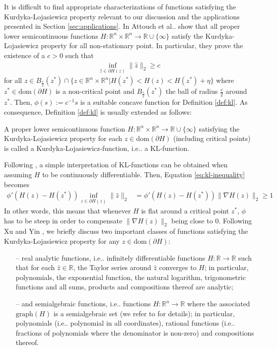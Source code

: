 \documentclass[onecolumn,final,a4paper,13pt,reqno]{siamart}
\makeatletter
\DeclareRobustCommand\onedot{\futurelet\@let@token\@onedot}
\def\@onedot{\ifx\@let@token.\else.\null\fi\xspace}
\def\ie{{i.e}\onedot} \def\Ie{{I.e}\onedot}
\def\etal{{et al}\onedot}
\def\dom{\text{dom}}
\makeatother
\begin{document}
It is difficult to find appropriate characterizations of functions satisfying the Kurdyka-Lojasiewicz property relevant to our discussion and the applications presented in Section \ref{sec:applications}. In \cite{AttouchBolteRedontSoubeyran:2010} Attouch \etal show that all proper lower semicontinuous functions $H : \mathbb{R}^n \times \mathbb{R}^n \rightarrow \mathbb{R} \cup \{\infty\}$ satisfy the Kurdyka-Lojasiewicz property for all non-stationary point. In particular, they prove the existence of a $c > 0$ such that
\begin{align}
	\inf_{\hat{z} \in \partial H(z)} \|\hat{z}\|_2 \geq c
\end{align}
for all $z \in B_{\frac{c}{2}}(z^\ast) \cap \{z \in \mathbb{R}^n \times \mathbb{R}^n | H(z^\ast) < H(z) < H(z^\ast) + \eta\}$ where $z^\ast \in \dom(\partial H)$ is a non-critical point and $B_{\frac{c}{2}}(z^\ast)$ the ball of radius $\frac{c}{2}$ around $z^\ast$. Then, $\phi(s) := c^{-1}s$ is a suitable concave function for Definition \ref{def:kl}. As consequence, Definition \ref{def:kl} is usually extended as follows:

\begin{definitionmd}
	A proper lower semicontinuous function $H : \mathbb{R}^n \times \mathbb{R}^n \rightarrow \mathbb{R} \cup \{\infty\}$ satisfying the Kurdyka-Lojasiewicz property for each $z \in \dom (\partial H)$ (including critical points) is called a Kurdyka-Lojasiewicz-function, \ie a KL-function.
\end{definitionmd}

Following \cite{FrankelGarrigosPeypuquet:2015}, a simple interpretation of KL-functions can be obtained when assuming $H$ to be continuously differentiable. Then, Equation \eqref{eq:kl-inequality} becomes
\begin{align}
	\phi'(H(z) - H(z^\ast)) \inf_{\hat{z} \in \partial H(z)}\|\hat{z}\|_2 &= \phi'(H(z) - H(z^\ast)) \|\nabla H(z)\|_2 \geq 1
\end{align}
In other words, this means that whenever $H$ is flat around a critical point $z^\ast$, $\phi$ has to be steep in order to compensate $\|\nabla H(z)\|_2$ being close to $0$. Following Xu and Yin \cite{XuYin:2013}, we briefly discuss two important classes of functions satisfying the Kurdyka-Lojasiewicz property for any $z \in \dom (\partial H)$:
\begin{itemize}
	\item[--] real analytic functions, \ie infinitely differentiable functions $H: \mathbb{R} \rightarrow \mathbb{R}$ such that for each $\hat{z} \in \mathbb{R}$, the Taylor series around $\hat{z}$ converges to $H$; in particular, polynomials, the exponential function, the natural logarithm, trigonometric functions and all sums, products and compositions thereof are analytic;
	\item[--] and semialgebraic functions, \ie functions $H : \mathbb{R}^n \rightarrow \mathbb{R}$ where the associated  $\text{graph}(H)$ is a semialgebraic set (we refer to \cite{Coste:2002} for details); in particular, polynomials (\ie polynomial in all coordinates),  rational functions (\ie fractions of polynomials where the denominator is non-zero) and compositions thereof.
\end{itemize}
\end{document}
